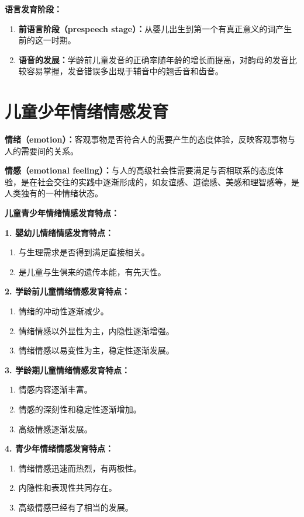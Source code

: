 \begin{tipbox}
\textbf{语言发育阶段：}

\begin{enumerate}[leftmargin=*]
    \item \textbf{前语言阶段（prespeech stage）：}从婴儿出生到第一个有真正意义的词产生前的这一时期。
    \item \textbf{语音的发展：}学龄前儿童发音的正确率随年龄的增长而提高，对韵母的发音比较容易掌握，发音错误多出现于辅音中的翘舌音和齿音。
\end{enumerate}
\end{tipbox}

\section{儿童少年情绪情感发育}

\begin{defbox}
\textbf{情绪（emotion）：}客观事物是否符合人的需要产生的态度体验，反映客观事物与人的需要间的关系。

\textbf{情感（emotional feeling）：}与人的高级社会性需要满足与否相联系的态度体验，是在社会交往的实践中逐渐形成的，如友谊感、道德感、美感和理智感等，是人类独有的一种情绪状态。
\end{defbox}

\begin{keybox}
\textbf{儿童青少年情绪情感发育特点：}

\textbf{1. 婴幼儿情绪情感发育特点：}
\begin{enumerate}[leftmargin=*]
    \item 与生理需求是否得到满足直接相关。
    \item 是儿童与生俱来的遗传本能，有先天性。
\end{enumerate}

\textbf{2. 学龄前儿童情绪情感发育特点：}
\begin{enumerate}[leftmargin=*]
    \item 情绪的冲动性逐渐减少。
    \item 情绪情感以外显性为主，内隐性逐渐增强。
    \item 情绪情感以易变性为主，稳定性逐渐发展。
\end{enumerate}

\textbf{3. 学龄期儿童情绪情感发育特点：}
\begin{enumerate}[leftmargin=*]
    \item 情感内容逐渐丰富。
    \item 情感的深刻性和稳定性逐渐增加。
    \item 高级情感逐渐发展。
\end{enumerate}

\textbf{4. 青少年情绪情感发育特点：}
\begin{enumerate}[leftmargin=*]
    \item 情绪情感迅速而热烈，有两极性。
    \item 内隐性和表现性共同存在。
    \item 高级情感已经有了相当的发展。
\end{enumerate}
\end{keybox}

